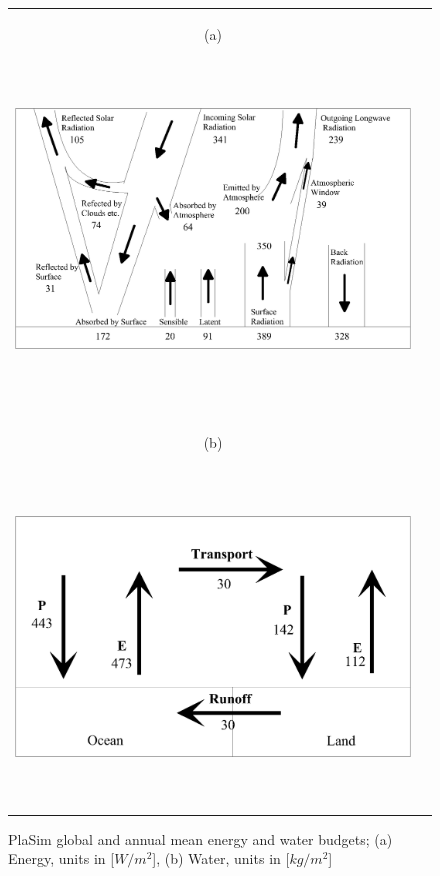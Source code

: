 \documentclass[12pt,a4paper,twoside,openright,headinclude,liststotoc,bibtotoc]{scrreprt}
\begin{document}
\begin{figure}[c]
\begin{tabular}{cc}
\begin{minipage}{1.0\textwidth}\hspace{1.15cm}\begin{scriptsize}(a)\end{scriptsize} \vspace{-0.15cm}
\begin{center}
\includegraphics[height=9.0cm]{eps/heat.eps}
\end{center}
\end{minipage}
\\
\\
\\
\begin{minipage}{1.0\textwidth}\hspace{1.15cm}\begin{scriptsize}(b)\end{scriptsize} \vspace{-0.15cm}
\begin{center}
\includegraphics[height=9.0cm]{eps/water.eps}
\end{center}
\end{minipage}
\end{tabular}
\caption[PlaSim global and annual mean energy and water budgets]{PlaSim global and annual mean energy and water budgets; (a) Energy, units in [$W/m^2$], (b) Water, units in [$kg/m^{2}$]}
\label{img:enercycle}
\end{figure}
\end{document}
